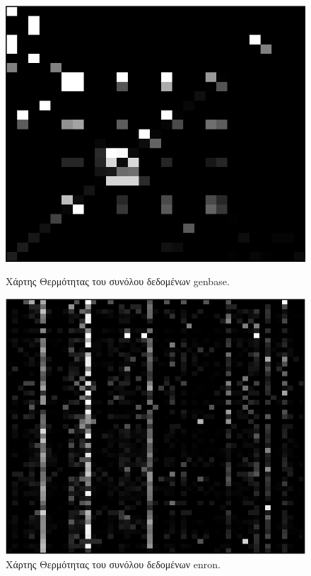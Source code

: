\begin{description}
\begin{figure}[!htb]
  \includegraphics[width=\linewidth]{./images/genbaseHeatMap.png}
  \caption{Χάρτης Θερμότητας του συνόλου δεδομένων genbase.}
  \label{graph:genbaseHeatMap}
\endminipage\hfill
{}
  \includegraphics[width=\linewidth]{./images/enronHeatMap.png}
  \caption{Χάρτης Θερμότητας του συνόλου δεδομένων enron.}
  \label{graph:enronHeatMap}
\endminipage\hfill
\end{figure}


\end{description}
